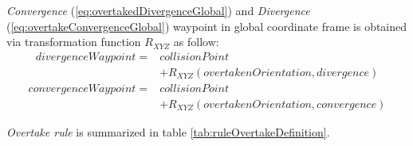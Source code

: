    \emph{Convergence} (\ref{eq:overtakedDivergenceGlobal}) and \emph{Divergence} (\ref{eq:overtakeConvergenceGlobal}) waypoint in global coordinate frame is obtained via transformation function $R_{XYZ}$ as follow:
    \begin{equation}\label{eq:overtakedDivergenceGlobal}
        \begin{split}
            divergenceWaypoint = & collisionPoint \\ &+ R_{XYZ}(overtakenOrientation,divergence)    
        \end{split}
    \end{equation}
    \begin{equation}\label{eq:overtakeConvergenceGlobal}
        \begin{split}
            convergenceWaypoint =  & collisionPoint \\ &+ R_{XYZ}(overtakenOrientation,convergence) 
        \end{split}
    \end{equation}
    
    \noindent \emph{Overtake rule} is summarized in table \ref{tab:ruleOvertakeDefinition}.    
            
